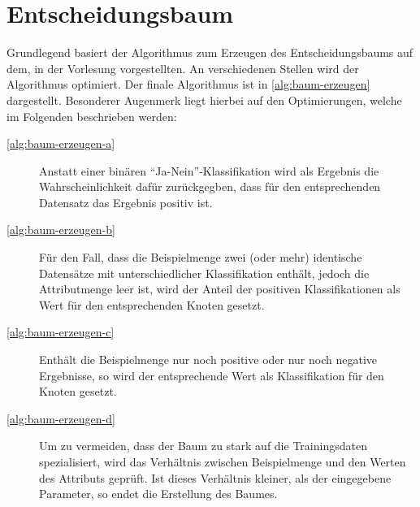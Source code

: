 \newpage
\section{Entscheidungsbaum}\label{sec:entscheidungsbaum}

Grundlegend basiert der Algorithmus zum Erzeugen des Entscheidungsbaums auf dem,
in der Vorlesung vorgestellten. An verschiedenen Stellen wird der Algorithmus optimiert.
Der finale Algorithmus ist in \autoref{alg:baum-erzeugen} dargestellt.
Besonderer Augenmerk liegt hierbei auf den Optimierungen, welche im Folgenden beschrieben werden:
\begin{description}
    \item[\autoref{alg:baum-erzeugen-a}] Anstatt einer binären \enquote{Ja-Nein}-Klassifikation wird als Ergebnis die Wahrscheinlichkeit dafür zurückgegben,
                    dass für den entsprechenden Datensatz das Ergebnis positiv ist.

    \item[\autoref{alg:baum-erzeugen-b}] Für den Fall, dass die Beispielmenge zwei (oder mehr) identische Datensätze mit unterschiedlicher Klassifikation enthält,
    jedoch die Attributmenge leer ist, wird der Anteil der positiven Klassifikationen als Wert für den entsprechenden Knoten gesetzt.
    \item[\autoref{alg:baum-erzeugen-c}] Enthält die Beispielmenge nur noch positive oder nur noch negative Ergebnisse,
        so wird der entsprechende Wert als Klassifikation für den Knoten gesetzt.
    \item[\autoref{alg:baum-erzeugen-d}] Um zu vermeiden, dass der Baum zu stark auf die Trainingsdaten spezialisiert,
        wird das Verhältnis zwischen Beispielmenge und den Werten des Attributs geprüft.
        Ist dieses Verhältnis kleiner, als der eingegebene Parameter, so endet die Erstellung des Baumes.

\end{description}

